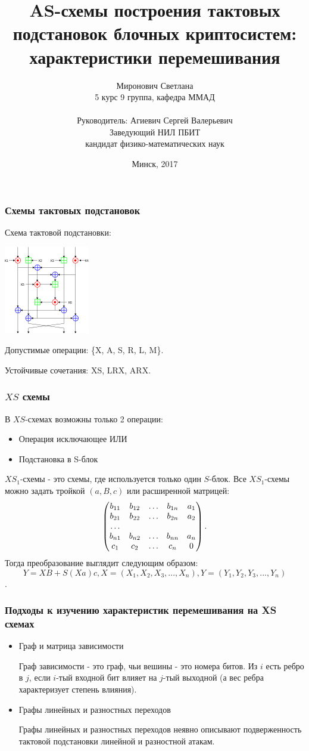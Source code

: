 \documentclass{beamer}
\title[XS-схемы] %
{AS-схемы построения тактовых подстановок блочных криптосистем: характеристики перемешивания}
\author[Миронович С.] %
{Миронович Светлана\\ 5 курс 9 группа, кафедра ММАД\\~ \\Руководитель: Агиевич Сергей Валерьевич \\ Заведующий НИЛ ПБИТ\\ кандидат физико-математических наук}
\institute[БГУ] %
{
  Белорусский государственный университет\\
  Факультет прикладной математики и информатики
}
\date[2017] %
{Минск, 2017}
\begin{document}
\frame{\titlepage}
\begin{frame}
\frametitle{Схемы тактовых подстановок}
\begin{center}
Схема тактовой подстановки:

\includegraphics{2}
\end{center}
Допустимые операции: \{X, A, S, R, L, M\}.

Устойчивые сочетания: XS, LRX, ARX.
\end{frame}
  \begin{frame}
    \frametitle{$XS$ схемы}
В $XS$-схемах возможны только 2 операции:
\begin{itemize}
\item Операция исключающее ИЛИ
\item Подстановка в S-блок
\end{itemize}
$XS_1$-схемы - это схемы, где используется только один $S$-блок.
Все $XS_1$-схемы можно задать тройкой $(a, B, c)$ или расширенной матрицей:
$$
\begin{pmatrix}
b_{11} & b_{12} & \ldots & b_{1n} & a_1\\
b_{21} & b_{22} & \ldots & b_{2n} & a_2\\
\dotfill\\
b_{n1} & b_{n2} & \ldots & b_{nn} & a_n\\
c_1    & c_2    & \ldots & c_n    & 0\\
\end{pmatrix}.
$$
Тогда преобразование выглядит следующим образом:
$$Y = XB + S(Xa)c, X = (X_1, X_2, X_3, ..., X_n), Y = (Y_1, Y_2, Y_3, ..., Y_n)$$.
  \end{frame}

 \begin{frame}
    \frametitle{Подходы к изучению характеристик перемешивания на XS схемах}

\begin{itemize}
\item Граф и матрица зависимости

Граф зависимости - это граф, чьи вешины - это номера битов. Из $i$ есть ребро в $j$, если $i$-тый входной бит влияет на $j$-тый выходной (а вес ребра характеризует степень влияния).
\item Графы линейных и разностных переходов

Графы линейных и разностных переходов неявно описывают подверженность тактовой подстановки линейной и разностной атакам.
\end{itemize}
  \end{frame}
\end{document}
